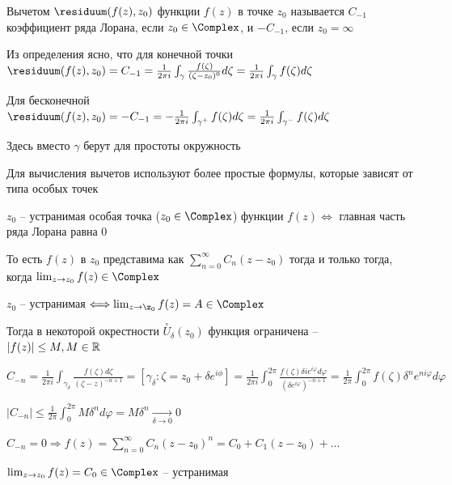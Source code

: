 \documentclass[12pt]{article}
\begin{document}
\Def Вычетом $\residuum(f(z), z_0)$ функции $f(z)$ в точке $z_0$ называется $C_{-1}$ коэффициент ряда Лорана, если $z_0 \in \Complex$, и $-C_{-1}$, если $z_0 = \infty$









Из определения ясно, что для конечной точки $\residuum(f(z), z_0) = C_{-1} = \frac{1}{2\pi i} \int_\gamma \frac{f(\zeta)}{(\zeta - z_0)^0} d\zeta = \frac{1}{2\pi i} \int_\gamma f(\zeta) d\zeta$

Для бесконечной $\residuum(f(z), z_0) = -C_{-1} = -\frac{1}{2\pi i} \int_{\gamma^+} f(\zeta) d\zeta = \frac{1}{2\pi i} \int_{\gamma^-} f(\zeta) d\zeta$

Здесь вместо $\gamma$ берут для простоты окружность

\Nota Для вычисления вычетов используют более простые формулы, которые зависят от типа особых точек

\begin{MyTheorem}
     $z_0$ -- устранимая особая точка ($z_0 \in \Complex$) функции $f(z) \Longleftrightarrow$ главная часть ряда Лорана равна 0
    
    То есть $f(z)$ в $z_0$ представима как $\sum_{n = 0}^\infty C_n (z - z_0)$ тогда и только тогда, когда $\lim_{z \to z_0} f(z) \in \Complex$
\end{MyTheorem}

\begin{MyProof}
    \fbox{$\Longrightarrow$} $z_0$ -- устранимая $\Longleftrightarrow \lim_{z \to \z_0} f(z) = A \in \Complex$

    Тогда в некоторой окрестности $\overset{\circ}{U}_\delta (z_0)$ функция ограничена -- $|f(z)| \leq M, M \in \mathbb{R}$

    $C_{-n} = \frac{1}{2\pi i} \int_{\gamma_\delta} \frac{f(\zeta)d\zeta}{(\zeta - z)^{-n + 1}} = \left[\gamma_\delta: \zeta = z_0 + \delta e^{i\phi}\right] = \frac{1}{2\pi i} \int_{0}^{2\pi} \frac{f(\zeta) \delta i e^{i\varphi} d\varphi}{(\delta e^{i\varphi})^{-n + 1}} = \frac{1}{2\pi} \int_0^{2\pi} f(\zeta) \delta^{n} e^{ni\varphi} d\varphi$

    $|C_{-n}| \leq \frac{1}{2\pi} \int_0^{2\pi} M \delta^n d\varphi = M \delta^n \underset{\delta \to 0}{\longrightarrow} 0$

    \mediumvspace

    \fbox{$\Longleftarrow$} $C_{-n} = 0 \Longrightarrow f(z) = \sum_{n = 0}^\infty C_n (z - z_0)^n = C_0 + C_1 (z - z_0) + \dots$

    $\lim_{z \to z_0} f(z) = C_0 \in \Complex$ -- устранимая
\end{MyProof}
\end{document}
